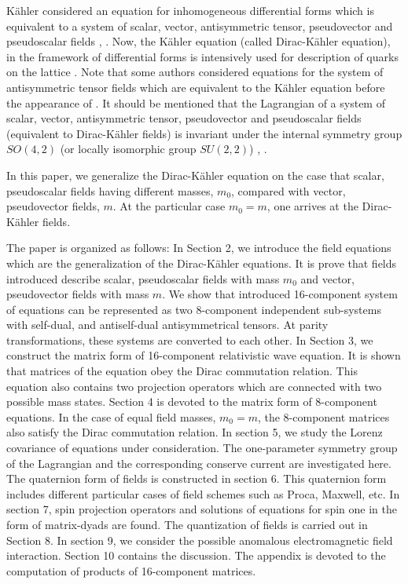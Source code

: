 \documentclass[a4paper,12pt]{article}
\begin{document}
K\"ahler \cite{Kahler} considered an equation for inhomogeneous
differential forms which is equivalent to a system of scalar,
vector, antisymmetric tensor, pseudovector and pseudoscalar fields
\cite{Kruglov1}, \cite{monogr}. Now, the K\"ahler equation (called
Dirac-K\"ahler equation), in the framework of differential forms
is intensively used for description of quarks on the lattice
\cite{Becher}. Note that some authors \cite{Ivanenko} considered
equations for the system of antisymmetric tensor fields which are
equivalent to the K\"ahler equation before the appearance of
\cite{Kahler}. It should be mentioned that the Lagrangian of a
system of scalar, vector, antisymmetric tensor, pseudovector and
pseudoscalar fields (equivalent to Dirac-K\"ahler fields) is
invariant under the internal symmetry group $SO(4,2)$ (or locally
isomorphic group $SU(2,2)$) \cite{Kruglov1}, \cite{monogr}.

In this paper, we generalize the Dirac-K\"ahler equation on the
case that scalar, pseudoscalar fields having different masses,
$m_0$, compared with vector, pseudovector fields, $m$. At the
particular case $m_0=m$, one arrives at the Dirac-K\"ahler fields.

The paper is organized as follows: In Section 2, we introduce the
field equations which are the generalization of the Dirac-K\"ahler
equations. It is prove that fields introduced describe scalar,
pseudoscalar fields with mass $m_0$ and vector, pseudovector
fields with mass $m$. We show that introduced 16-component system
of equations can be represented as two 8-component independent
sub-systems with self-dual, and antiself-dual antisymmetrical
tensors. At parity transformations, these systems are converted to
each other. In Section 3, we construct the matrix form of
16-component relativistic wave equation. It is shown that matrices
of the equation obey the Dirac commutation relation. This equation
also contains two projection operators which are connected with
two possible mass states. Section 4 is devoted to the matrix form
of 8-component equations. In the case of equal field masses,
$m_0=m$, the 8-component matrices also satisfy the Dirac
commutation relation. In section 5, we study the Lorenz covariance
of equations under consideration. The one-parameter symmetry group
of the Lagrangian and the corresponding conserve current are
investigated here. The quaternion form of fields is constructed in
section 6. This quaternion form includes different particular
cases of field schemes such as Proca, Maxwell, etc. In section 7,
spin projection operators and solutions of equations for spin one
in the form of matrix-dyads are found. The quantization of fields
is carried out in Section 8. In section 9, we consider the
possible anomalous electromagnetic field interaction. Section 10
contains the discussion. The appendix is devoted to the
computation of products of 16-component matrices.
\end{document}
